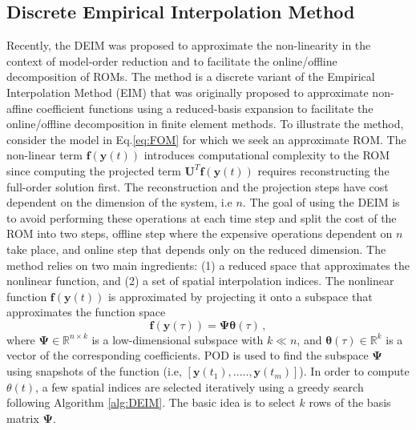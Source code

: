 \documentclass[]{interact}
\theoremstyle{plain}%
\theoremstyle{definition}
\theoremstyle{remark}
\begin{document}

\subsection{Discrete Empirical Interpolation Method}

\label{sec:DEIM}
Recently, the DEIM \cite{chaturantabut2010nonlinear} was proposed to approximate the non-linearity in the context of model-order reduction and to facilitate the online/offline decomposition of ROMs.
The method is a discrete variant of the Empirical Interpolation Method (EIM) \cite{barrault2004empirical} that was originally proposed to approximate
non-affine coefficient functions using a reduced-basis expansion to facilitate the online/offline decomposition in finite element methods.
To illustrate the method, consider the model in Eq.\ref{eq:FOM} for which we seek an approximate ROM.
The non-linear term $\mathbf{f}(\textbf{y}(t))$ introduces computational complexity to the ROM since computing the projected term $\mathbf{U}^T\mathbf{f}(\textbf{y}(t))$ requires reconstructing the full-order  solution first.
The reconstruction and the projection steps have cost dependent on the dimension of the system, i.e $n$.
The goal of using the DEIM is to avoid performing these operations at each time step and split the cost of the ROM into two steps,
offline step where the expensive operations dependent on $n$ take place, and online step that depends only on the reduced dimension.
The method relies on two main ingredients: (1) a reduced space that approximates the nonlinear function, and (2) a set of spatial interpolation indices.
The nonlinear function $\mathbf{f}(\textbf{y}(t))$ is approximated by projecting it onto a subspace that approximates the function space
\begin{equation}
	\mathbf{f}(\textbf{y}(\tau)) = \mathbf{\Psi}\boldsymbol{\theta}(\tau)\, ,
\end{equation}
where $\mathbf{\Psi} \in \mathbb{R}^{n\times k}$ is a low-dimensional subspace with $k \ll n$, and $\boldsymbol{\theta}(\tau) \in \mathbb{R}^k$ is a vector of the corresponding coefficients.
POD is used to find the subspace $\mathbf{\Psi}$ using snapshots of the function (i.e, $[\textbf{y}(t_1), ....., \textbf{y}(t_m)]$).
In order to compute $\theta(t)$, a few spatial indices are selected iteratively using a greedy search following Algorithm \ref{alg:DEIM}.
The basic idea is to select $k$ rows of the basis matrix $\mathbf{\Psi}$.
\end{document}
